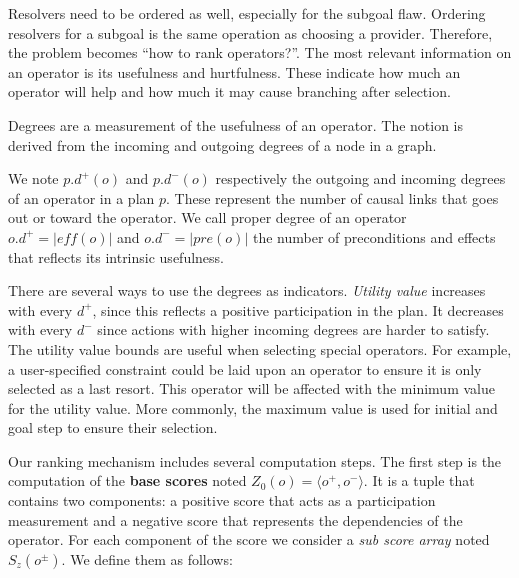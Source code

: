 Resolvers need to be ordered as well, especially for the subgoal flaw.
Ordering resolvers for a subgoal is the same operation as choosing a
provider. Therefore, the problem becomes ``how to rank operators?''. The
most relevant information on an operator is its usefulness and
hurtfulness. These indicate how much an operator will help and how much
it may cause branching after selection.

\begin{definition}

Degrees are a measurement of the usefulness of an operator. The notion
is derived from the incoming and outgoing degrees of a node in a graph.

We note \(p.d^+(o)\) and \(p.d^-(o)\) respectively the outgoing and
incoming degrees of an operator in a plan \(p\). These represent the
number of causal links that goes out or toward the operator. We call
proper degree of an operator \(o.d^+ = |eff(o)|\) and
\(o.d^- = |pre(o)|\) the number of preconditions and effects that
reflects its intrinsic usefulness.

\end{definition}

There are several ways to use the degrees as indicators. \emph{Utility
value} increases with every \(d^+\), since this reflects a positive
participation in the plan. It decreases with every \(d^-\) since actions
with higher incoming degrees are harder to satisfy. The utility value
bounds are useful when selecting special operators. For example, a
user-specified constraint could be laid upon an operator to ensure it is
only selected as a last resort. This operator will be affected with the
minimum value for the utility value. More commonly, the maximum value is
used for initial and goal step to ensure their selection.

Our ranking mechanism includes several computation steps. The first step
is the computation of the \textbf{base scores} noted
\(Z_0(o)=\langle o^+, o^-\rangle\). It is a tuple that contains two
components: a positive score that acts as a participation measurement
and a negative score that represents the dependencies of the operator.
For each component of the score we consider a \emph{sub score array}
noted \(S_z(o^\pm)\). We define them as follows:

